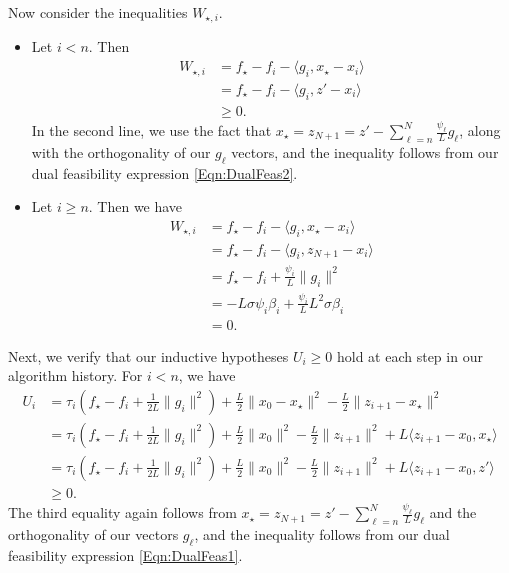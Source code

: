 \documentclass[11pt]{article}
\numberwithin{equation}{section}
\theoremstyle{definition}
\theoremstyle{plain}
\theoremstyle{definition}
\begin{document}
Now consider the inequalities $W_{\star,i}$. 
\begin{itemize}
    \item Let $i<n$. Then
\begin{align*}
    W_{\star,i} &= f_\star - f_i - \langle g_i, x_\star - x_i \rangle \\
    & = f_\star - f_i - \langle g_i, z' - x_i \rangle \\
    & \geq 0.
\end{align*}
In the second line, we use the fact that $x_\star = z_{N+1} = z' - \sum_{\ell = n}^N \frac{\psi_\ell}{L} g_\ell$, along with the orthogonality of our $g_\ell$ vectors, and the inequality follows from our dual feasibility expression \eqref{Eqn:DualFeas2}.

\item Let $i \geq n$. Then we have
\begin{align*}
    W_{\star,i} &= f_\star - f_i - \langle g_i, x_\star - x_i \rangle \\
    & = f_\star - f_i - \langle g_i, z_{N+1} - x_i \rangle \\
    & = f_\star - f_i + \frac{\psi_i}{L}\|g_i\|^2 \\
    & = -L \sigma \psi_i \beta_i + \frac{\psi_i}{L} L^2 \sigma \beta_i \\
    &= 0.
\end{align*}
\end{itemize}

Next, we verify that our inductive hypotheses $U_i \geq 0$ hold at each step in our algorithm history. For $i<n$, we have
\begin{align*}
    U_i & = \tau_i\left(f_\star - f_i + \frac{1}{2L}\|g_i\|^2 \right) + \frac{L}{2}\|x_0 - x_\star\|^2 - \frac{L}{2}\|z_{i+1} - x_\star\|^2 \\
    & = \tau_i\left(f_\star - f_i + \frac{1}{2L}\|g_i\|^2 \right) + \frac{L}{2}\|x_0\|^2 - \frac{L}{2}\|z_{i+1}\|^2 + L \langle z_{i+1} - x_0 , x_\star \rangle \\
    & = \tau_i\left(f_\star - f_i + \frac{1}{2L}\|g_i\|^2 \right) + \frac{L}{2}\|x_0\|^2 - \frac{L}{2}\|z_{i+1}\|^2 + L \langle z_{i+1} - x_0 , z' \rangle \\
    & \geq 0.
\end{align*}
The third equality again follows from $x_\star = z_{N+1} = z' - \sum_{\ell = n}^{N} \frac{\psi_\ell}{L} g_\ell$ and the orthogonality of our vectors $g_\ell$, and the inequality follows from our dual feasibility expression \eqref{Eqn:DualFeas1}.
\end{document}
